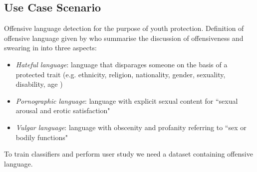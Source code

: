 \subsection{Use Case Scenario}
Offensive language detection for the purpose of youth protection.\newline
Definition of offensive language given by \cite{chen2012detecting} who summarise the discussion of offensiveness and swearing in \cite{jay2008pragmatics} into three aspects:
\begin{itemize}
	\item \textit{Hateful language}: language that disparages someone on the basis of a protected trait (e.g. ethnicity, religion, nationality, gender, sexuality, disability, age \cite{diakopoulos2016accountability})
	\item \textit{Pornographic language}: language with explicit sexual content for ``sexual arousal and erotic satisfaction" \cite{jay2008pragmatics}
	\item \textit{Vulgar language}: language with obscenity and profanity referring to ``sex or bodily functions" \cite{jay2008pragmatics}	
\end{itemize}
To train classifiers and perform user study we need a dataset containing offensive language.

